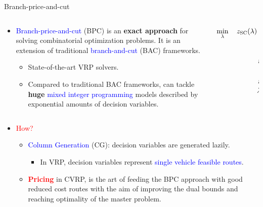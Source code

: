 \begin{frame}{Branch-price-and-cut}
	\begin{columns}
		\begin{column}{.7\textwidth}
			\begin{itemize}[<+->]
				\item \textcolor{blue}{Branch-price-and-cut} (BPC) is an \textbf{exact approach} for solving combinatorial optimization problems. It is an extension of traditional \textcolor{blue}{branch-and-cut} (BAC) frameworks.
				      \begin{itemize}
					      \item State-of-the-art VRP solvers.
					            \pause[\thebeamerpauses]
					      \item Compared to traditional BAC frameworks, can tackle \textbf{huge} \textcolor{blue}{mixed integer programming} models described by exponential amounts of decision variables.
				      \end{itemize}
			\end{itemize}
		\end{column}
		\begin{column}{.3\textwidth}
			{
				\fontsize{9.5pt}{9.5pt}\selectfont

				\begin{align*}
					\min_{\lambda} \quad z_\mt{SC}(\lambda) & = \sum_{p \in P}  c_p \lambda_p                                      \\
					                                        & \sum_{p \in P} \lambda_{p} = K                                       \\
					                                        & \sum_{p \in P}  a_{ip} \lambda_p \ge 1       \quad \forall i \in V_0 \\
					                                        & \lambda_p                    \in \Set*{0, 1} \quad \forall p \in P.
				\end{align*}
			}
		\end{column}
	\end{columns}

	\pause[\thebeamerpauses]

	\begin{itemize}[<+->]
		\item \textcolor{red}{How?}
		      \begin{itemize}
			      \item \textcolor{blue}{Column Generation} (CG): decision variables are generated lazily.
			            \begin{itemize}
				            \item In VRP, decision variables represent \textcolor{blue}{single vehicle feasible routes}.
			            \end{itemize}
			      \item \textcolor{red}{\textbf{Pricing}} in CVRP, is the art of feeding the BPC approach with good reduced cost routes with the aim of improving the dual bounds and reaching optimality
			            of the master problem.
		      \end{itemize}
	\end{itemize}
\end{frame}

